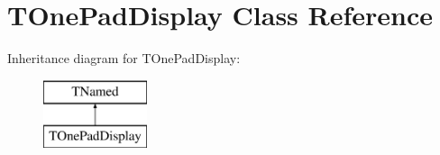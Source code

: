 \hypertarget{classTOnePadDisplay}{\section{T\-One\-Pad\-Display Class Reference}
\label{classTOnePadDisplay}
}
Inheritance diagram for T\-One\-Pad\-Display\-:\begin{figure}[H]
\begin{center}
\leavevmode
\includegraphics[height=2.000000cm]{classTOnePadDisplay}
\end{center}
\end{figure}
